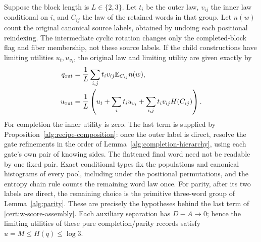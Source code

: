 Suppose the block length is $L\in\{2,3\}$.  Let $t_i$ be the outer
law, $v_{ij}$ the inner law conditional on $i$, and $C_{ij}$ the law of
the retained words in that group.  Let $n(w)$ count the original canonical source labels, obtained by
undoing each positional reindexing.  The intermediate cyclic rotation
changes only the completed-block flag and fiber membership, not these
source labels.  If the child constructions
have limiting utilities $u_t,u_{v_i}$, the original law and limiting utility
are given exactly by
\begin{align}
 q_{\rm out}&=\frac1L\sum_{i,j}t_iv_{ij}\mathbb E_{C_{ij}}n(w),
 \label{cert:w-law-assembly}\\
 u_{\rm out}&=\frac1L\left(u_t+\sum_it_i u_{v_i}
                      +\sum_{i,j}t_iv_{ij}H(C_{ij})\right).
 \label{cert:w-score-assembly}
\end{align}
For completion the inner utility is zero.  The last term is supplied by
Proposition~\ref{alg:recipe-composition}: once the outer label is direct,
resolve the gate refinements in the order of
Lemma~\ref{alg:completion-hierarchy}, using each gate's own pair of
knowing sides.  The flattened final word need not be readable by one fixed
pair.  Exact conditional types fix the populations and canonical histograms
of every pool, including under the positional permutations, and the entropy
chain rule counts the remaining word law once.  For parity, after its two
labels are direct, the remaining choice is the primitive three-word group
of Lemma~\ref{alg:parity}.  These are precisely the hypotheses behind the
last term of \eqref{cert:w-score-assembly}.  Each auxiliary separation has
$D-A\to0$; hence the limiting utilities of these pure completion/parity
records satisfy $u=M\le H(q)\le\log3$.

